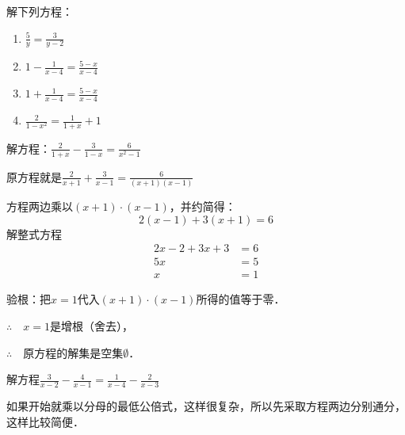 \begin{ex}
   解下列方程：
   \begin{multicols}{2}
       \begin{enumerate}
        \item $\frac{5}{y}=\frac{3}{y-2}$
        \item $1-\frac{1}{x-4}=\frac{5-x}{x-4}$
        \item $1+\frac{1}{x-4}=\frac{5-x}{x-4}$
        \item $\frac{2}{1-x^2}=\frac{1}{1+x}+1$
    \end{enumerate}
   \end{multicols}
   
\end{ex}

\begin{example}
    解方程：$\frac{2}{1+x}-\frac{3}{1-x}=\frac{6}{x^2-1}$
\end{example}

\begin{solution}
原方程就是$\frac{2}{x+1}+\frac{3}{x-1}=\frac{6}{(x+1)(x-1)}$

方程两边乘以$(x+1)\cdot (x-1)$，并约简得：
\[2(x-1)+3(x+1)=6\]
解整式方程
\[\begin{split}
    2x-2+3x+3&=6\\
    5x&=5\\
    x&=1
\end{split}\]
 
验根：把$x=1$代入$(x+1)\cdot (x-1)$所得的值等于零．

$\therefore\quad x=1$是增根（舍去），

$\therefore\quad$原方程的解集是空集$\emptyset$．
\end{solution}



\begin{example}
解方程$\frac{3}{x-2}-\frac{4}{x-1}=\frac{1}{x-4}-\frac{2}{x-3}$
\end{example}

\begin{analyze}
如果开始就乘以分母的最低公倍式，这样很复杂，所以先采取方程两边分别通分，这样比较简便．
\end{analyze}

